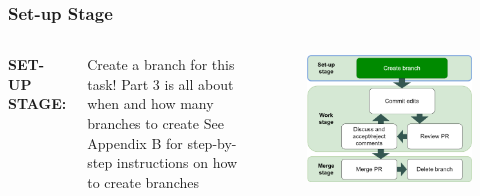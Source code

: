 \documentclass[aspectratio=169]{beamer} %
\begin{document}
\begin{frame}
	\frametitle{Set-up Stage}
	\begin{columns}[c]


		\Large \textbf{SET-UP STAGE:}
		\vspace{.8em}
	
		\normalsize
		Create a branch for this task!
		\vspace{.5cm}\newline
		Part 3 is all about when and how many branches to create
		\vspace{.5cm}\newline
		See Appendix B for step-by-step instructions on how to create branches
		
		\vspace{-.75cm}
		\begin{figure}
			\centering
			\includegraphics[width=\textwidth]{./img/branch-pr-merge-cycle-S1a.png}
		\end{figure}

	\end{columns}
\end{frame}
\end{document}
